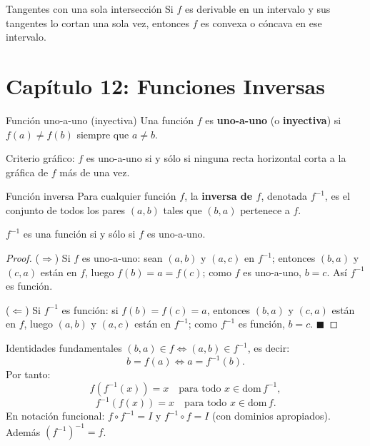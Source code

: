 \documentclass[12pt]{article}
\begin{document}
\begin{teorema}[4]{Tangentes con una sola intersección}
Si $f$ es derivable en un intervalo y sus tangentes lo cortan una sola vez, entonces $f$ es convexa o cóncava en ese intervalo.
\end{teorema}

\section{Capítulo 12: Funciones Inversas}

\begin{definicion}[]{Función uno-a-uno (inyectiva)}
Una función $f$ es \textbf{uno-a-uno} (o \textbf{inyectiva}) si $f(a) \neq f(b)$ siempre que $a \neq b$.

Criterio gráfico: $f$ es uno-a-uno si y sólo si ninguna recta horizontal corta a la gráfica de $f$ más de una vez.
\end{definicion}

\begin{definicion}[]{Función inversa}
Para cualquier función $f$, la \textbf{inversa de $f$}, denotada $f^{-1}$, es el conjunto de todos los pares $(a, b)$ tales que $(b, a)$ pertenece a $f$.
\end{definicion}

\begin{teorema}[1]{}
$f^{-1}$ es una función si y sólo si $f$ es uno-a-uno.
\end{teorema}

\begin{proof}
($\Rightarrow$) Si $f$ es uno-a-uno: sean $(a,b)$ y $(a,c)$ en $f^{-1}$; entonces $(b,a)$ y $(c,a)$ están en $f$, luego $f(b)=a=f(c)$; como $f$ es uno-a-uno, $b=c$. Así $f^{-1}$ es función.

($\Leftarrow$) Si $f^{-1}$ es función: si $f(b)=f(c)=a$, entonces $(b,a)$ y $(c,a)$ están en $f$, luego $(a,b)$ y $(a,c)$ están en $f^{-1}$; como $f^{-1}$ es función, $b=c$.
$\blacksquare$
\end{proof}

\begin{nota}[]{Identidades fundamentales}
$(b, a) \in f \iff (a, b) \in f^{-1}$, es decir:
\[ b = f(a) \iff a = f^{-1}(b). \]
Por tanto:
\[ f(f^{-1}(x)) = x \quad \text{para todo } x \in \text{dom}\,f^{-1}, \]
\[ f^{-1}(f(x)) = x \quad \text{para todo } x \in \text{dom}\,f. \]
En notación funcional: $f \circ f^{-1} = I$ y $f^{-1} \circ f = I$ (con dominios apropiados). Además $(f^{-1})^{-1} = f$.
\end{nota}
\end{document}
